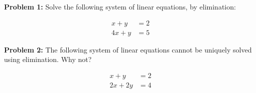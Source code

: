 \documentclass[a4paper,12pt]{article}
\begin{document}
{\Large{\bf Problem 1:}} Solve the following system of linear equations, by elimination:

\begin{align*}
x+y&=2\\
4x+y&=5
\end{align*}

\shunt

\shunt

\shunt

{\Large{\bf Problem 2:}} The following system of linear equations cannot be uniquely solved using elimination. Why not?

\begin{align*}
x+y&= 2\\
2x+2y &= 4
\end{align*}

\shunt

\shunt

\shunt
\end{document}
